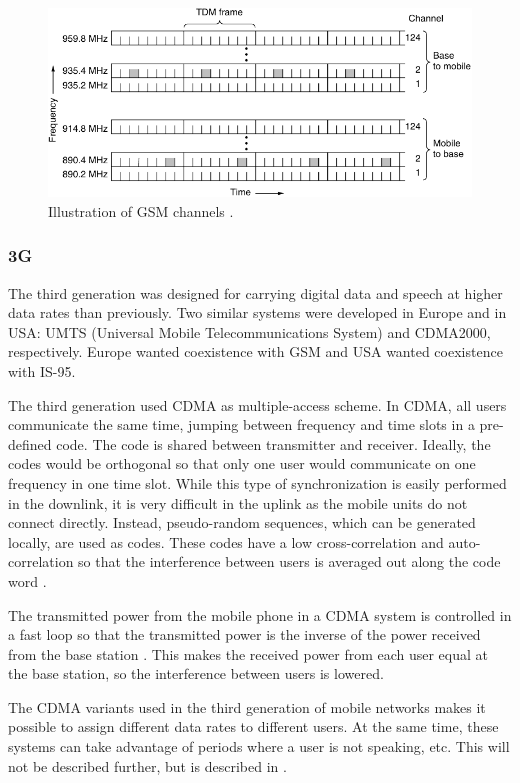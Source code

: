 \begin{figure}[htbp]
    \centering
    \includegraphics{img/analysis/gsm}
    \caption{Illustration of GSM channels \cite{tanenbaum2012computer}.}
    \label{fig:gsmsplitup}
\end{figure}

\subsubsection{3G}
The third generation was designed for carrying digital data and speech at higher data rates than previously. Two similar systems were developed in Europe and in USA: UMTS (Universal Mobile Telecommunications System) and CDMA2000, respectively. Europe wanted coexistence with GSM and USA wanted coexistence with IS-95.

The third generation used CDMA as multiple-access scheme. In CDMA, all users communicate the same time, jumping between frequency and time slots in a pre-defined code. The code is shared between transmitter and receiver. Ideally, the codes would be orthogonal so that only one user would communicate on one frequency in one time slot. While this type of synchronization is easily performed in the downlink, it is very difficult in the uplink as the mobile units do not connect directly. Instead, pseudo-random sequences, which can be generated locally, are used as codes. These codes have a low cross-correlation and auto-correlation so that the interference between users is averaged out along the code word \cite{tanenbaum2012computer}.

The transmitted power from the mobile phone in a CDMA system is controlled in a fast loop so that the transmitted power is the inverse of the power received from the base station \cite{tanenbaum2012computer}. This makes the received power from each user equal at the base station, so the interference between users is lowered. 

The CDMA variants used in the third generation of mobile networks makes it possible to assign different data rates to different users. At the same time, these systems can take advantage of periods where a user is not speaking, etc. This will not be described further, but is described in \cite{tanenbaum2012computer}.

